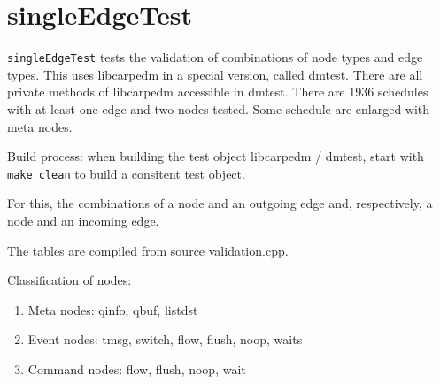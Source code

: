 \section{singleEdgeTest}
\texttt{singleEdgeTest} tests the validation of combinations of node types and edge types. This uses libcarpedm in a special version, called dmtest. 
There are all private methods of libcarpedm accessible in dmtest. There are 1936 schedules
with at least one edge and two nodes tested. Some schedule are enlarged with meta nodes.

Build process: when building the test object libcarpedm / dmtest, start with \texttt{make clean} to build a consitent test object.

For this, the combinations of a node and an outgoing edge and,
respectively, a node and an incoming edge.

The tables are compiled from source validation.cpp.

Classification of nodes:
\begin{enumerate}
\item Meta nodes: qinfo, qbuf, listdst
\item Event nodes: tmsg, switch, flow, flush, noop, waits
\item Command nodes: flow, flush, noop, wait
\end{enumerate}

